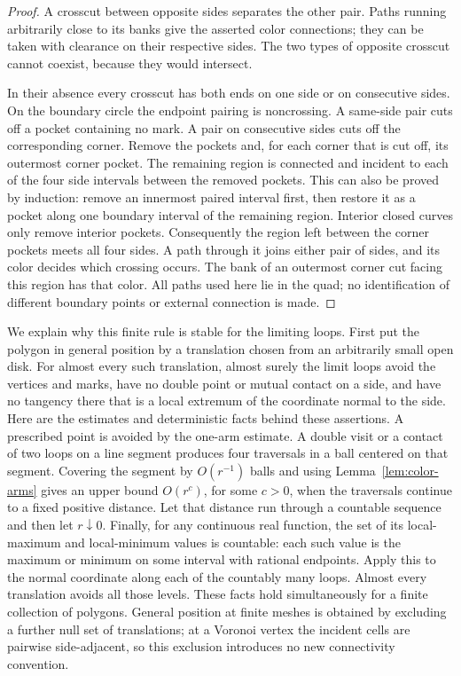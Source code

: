 \begin{proof}
A crosscut between opposite sides separates the other pair. Paths running
arbitrarily close to its banks give the asserted color connections; they can
be taken with clearance on their respective sides. The two types of opposite
crosscut cannot coexist, because they would intersect.

In their absence every crosscut has both ends on one side or on consecutive
sides. On the boundary circle the endpoint pairing is noncrossing. A same-side
pair cuts off a pocket containing no mark. A pair on consecutive sides cuts
off the corresponding corner. Remove the pockets and, for each corner that
is cut off, its outermost corner pocket. The remaining region is connected
and incident to each of the four side intervals between the removed pockets.
This can also be proved by induction: remove an innermost paired interval
first, then restore it as a pocket along one boundary interval of the remaining
region. Interior closed curves only remove interior pockets. Consequently the
region left between the corner pockets meets all four sides. A path through
it joins either pair of sides, and its color decides which crossing occurs.
The bank of an outermost corner cut facing this region has that color.
All paths used here lie in the quad; no identification of different boundary
points or external connection is made.
\end{proof}

We explain why this finite rule is stable for the limiting loops. First put
the polygon in general position by a translation chosen from an arbitrarily
small open disk. For almost every such translation, almost surely the limit
loops avoid the vertices and marks, have no double point or mutual contact on
a side, and have no tangency there that is a local extremum of the coordinate
normal to the side. Here are the estimates and deterministic facts behind
these assertions. A prescribed point is avoided by the one-arm estimate.
A double visit or a contact of two loops on a line segment produces four
traversals in a ball centered on that segment. Covering the segment by
$O(r^{-1})$ balls and using Lemma~\ref{lem:color-arms} gives an upper bound
$O(r^{c})$, for some $c>0$, when the traversals continue to a fixed positive
distance. Let that distance run through a countable sequence and then let
$r\downarrow0$. Finally, for any continuous real function, the set of its
local-maximum and local-minimum values is countable: each such value is the
maximum or minimum on some interval with rational endpoints. Apply this to
the normal coordinate along each of the countably many loops. Almost every
translation avoids all those levels. These facts hold simultaneously for a
finite collection of polygons. General position at finite meshes is obtained
by excluding a further null set of translations; at a Voronoi vertex the
incident cells are pairwise side-adjacent, so this exclusion introduces no
new connectivity convention.

